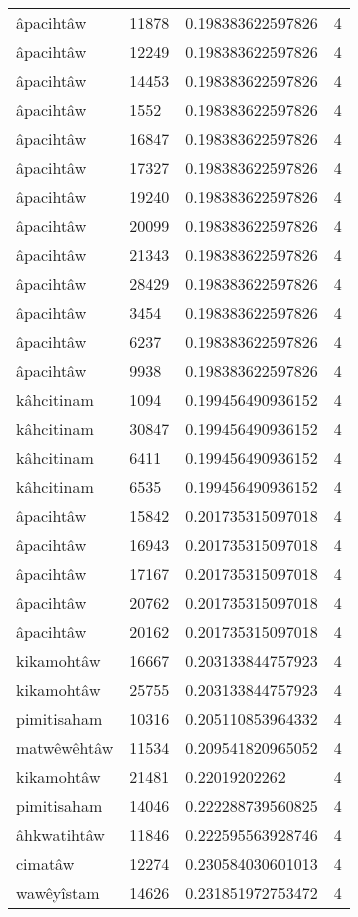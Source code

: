 \begin{longtable}{llll}
âpacihtâw & 11878 & 0.198383622597826 & 4 \\
âpacihtâw & 12249 & 0.198383622597826 & 4 \\
âpacihtâw & 14453 & 0.198383622597826 & 4 \\
âpacihtâw & 1552 & 0.198383622597826 & 4 \\
âpacihtâw & 16847 & 0.198383622597826 & 4 \\
âpacihtâw & 17327 & 0.198383622597826 & 4 \\
âpacihtâw & 19240 & 0.198383622597826 & 4 \\
âpacihtâw & 20099 & 0.198383622597826 & 4 \\
âpacihtâw & 21343 & 0.198383622597826 & 4 \\
âpacihtâw & 28429 & 0.198383622597826 & 4 \\
âpacihtâw & 3454 & 0.198383622597826 & 4 \\
âpacihtâw & 6237 & 0.198383622597826 & 4 \\
âpacihtâw & 9938 & 0.198383622597826 & 4 \\
kâhcitinam & 1094 & 0.199456490936152 & 4 \\
kâhcitinam & 30847 & 0.199456490936152 & 4 \\
kâhcitinam & 6411 & 0.199456490936152 & 4 \\
kâhcitinam & 6535 & 0.199456490936152 & 4 \\
âpacihtâw & 15842 & 0.201735315097018 & 4 \\
âpacihtâw & 16943 & 0.201735315097018 & 4 \\
âpacihtâw & 17167 & 0.201735315097018 & 4 \\
âpacihtâw & 20762 & 0.201735315097018 & 4 \\
âpacihtâw & 20162 & 0.201735315097018 & 4 \\
kikamohtâw & 16667 & 0.203133844757923 & 4 \\
kikamohtâw & 25755 & 0.203133844757923 & 4 \\
pimitisaham & 10316 & 0.205110853964332 & 4 \\
matwêwêhtâw & 11534 & 0.209541820965052 & 4 \\
kikamohtâw & 21481 & 0.22019202262 & 4 \\
pimitisaham & 14046 & 0.222288739560825 & 4 \\
âhkwatihtâw & 11846 & 0.222595563928746 & 4 \\
cimatâw & 12274 & 0.230584030601013 & 4 \\
wawêyîstam & 14626 & 0.231851972753472 & 4 \\

\end{longtable}
